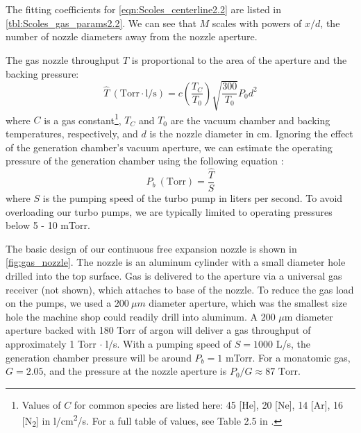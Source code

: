 The fitting coefficients for \cref{eqn:Scoles_centerline2.2} are listed in \cref{tbl:Scoles_gas_params2.2}. We can see that $M$ scales with powers of $x/d$, the number of nozzle diameters away from the nozzle aperture.

The gas nozzle throughput $\hat{T}$ is proportional to the area of the aperture and the backing pressure:
\begin{equation}
\hat{T} \ (\text{Torr} \cdot \text{l}/\text{s}) = c \left(\frac{T_C}{T_0} \right)\sqrt{\frac{300}{T_0}} P_0 d^2
\label{eqn:nozzle_thruput}
\end{equation}
where $C$ is a gas constant\footnote{Values of $C$ for common species are listed here: 45 [He], 20 [Ne], 14 [Ar], 16 [N\textsubscript{2}] in l/cm\textsuperscript{2}/s. For a full table of values, see Table 2.5 in \cite{millerFreeJetSources1988}.}, $T_C$ and $T_0$ are the vacuum chamber and backing temperatures, respectively, and $d$ is the nozzle diameter in cm. Ignoring the effect of the generation chamber's vacuum aperture, we can estimate the operating pressure of the generation chamber using the following equation \cite{hablanianHighvacuumTechnologyPractical1997}:
\begin{equation}
P_b \ (\text{Torr}) = \frac{\hat{T}}{S}
\end{equation}
where $S$ is the pumping speed of the turbo pump in liters per second. To avoid overloading our turbo pumps, we are typically limited to operating pressures below 5 - 10 mTorr.

The basic design of our continuous free expansion nozzle is shown in \cref{fig:gas_nozzle}. The nozzle is an aluminum cylinder with a small diameter hole drilled into the top surface. Gas is delivered to the aperture via a universal gas receiver (not shown), which attaches to base of the nozzle. To reduce the gas load on the pumps, we used a $200 \ \mu m$ diameter aperture, which was the smallest size hole the machine shop could readily drill into aluminum. A 200 $\mu$m diameter aperture backed with 180 Torr of argon will deliver a gas throughput of approximately {1 Torr $\cdot$ l/s}. With a pumping speed of $S = 1000$ L/s, the generation chamber pressure will be around $P_b = 1$ mTorr. For a monatomic gas, $G = 2.05$, and the pressure at the nozzle aperture is $P_0/G \approx 87 \textrm{ Torr}$.

